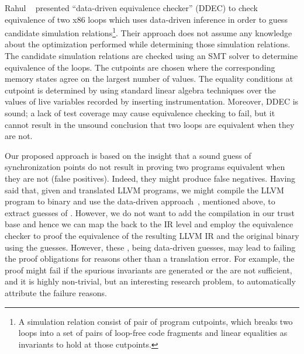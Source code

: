 

Rahul \etal~\cite{DDEC:OOPSLA:2013} presented ``data-driven equivalence
checker'' (DDEC) to check equivalence of two x86 loops which uses data-driven
inference in order to guess candidate simulation relations\footnote{A
  simulation relation consist of pair of program cutpoints, which breaks two
    loops into a set of pairs of loop-free code fragments and  linear
    equalities as invariants to hold at those cutpoints.}. Their approach does
    not assume any knowledge about the optimization performed while determining
    those simulation relations. The candidate simulation relations are checked
    using an SMT solver to determine equivalence of the loops. The cutpoints
    are chosen where the corresponding memory states agree on the largest
    number of values. The equality conditions   at cutpoint is determined by
    using standard linear algebra techniques over the values of live variables
    recorded by inserting instrumentation. Moreover, DDEC is sound; a lack of
    test coverage may cause equivalence checking to fail, but it cannot result
    in the unsound conclusion that two loops are equivalent when they are not.



Our proposed approach is based on the insight that a sound guess of
synchronization points do not result in proving two programs equivalent when
they are not (false positives). Indeed, they might produce false negatives.
Having said that, given  \ISA and translated LLVM programs, we might compile
the LLVM program to binary and use the data-driven
approach~\cite{DDEC:OOPSLA:2013}, mentioned above, to extract guesses of
\syncps. However, we do not want to add the compilation in our trust base and
hence we can map the \syncps back to the IR level and employ the equivalence
checker  to proof the equivalence of the resulting LLVM IR and the
original binary using the \syncp guesses. However, these \syncp, being
data-driven guesses, may lead to failing the proof obligations for reasons
other than a translation error. For example, the proof might fail if the
spurious invariants are generated or the \syncps are not sufficient, and it is
highly non-trivial, but an interesting research problem, to automatically
attribute the failure reasons. 


